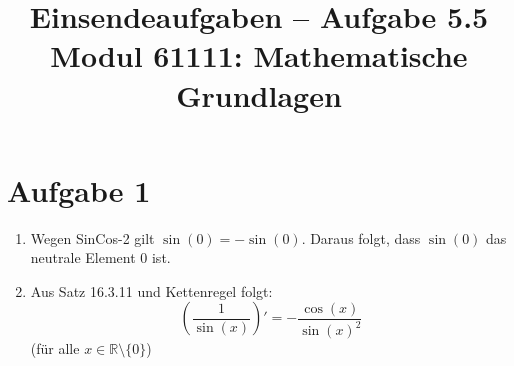 \documentclass[a4paper,12pt]{article}
\title{Einsendeaufgaben -- Aufgabe 5.5\\[0.5em]
\large Modul 61111: Mathematische Grundlagen}
\author{}
\date{}
\begin{document}
\maketitle

\section*{Aufgabe 1}
\begin{enumerate}[label=\alph*)]
  \item Wegen SinCos-2 gilt $\sin(0) = -\sin(0)$.
        Daraus folgt, dass $\sin(0)$ das neutrale Element $0$ ist.

  \item Aus Satz 16.3.11 und Kettenregel folgt:
        \[
            \left(\frac{1}{\sin(x)}\right)' = -\frac{\cos(x)}{\sin(x)^2}
        \]
        (für alle $x \in \mathbb{R} \setminus \{0\}$)
\end{enumerate}
\end{document}
